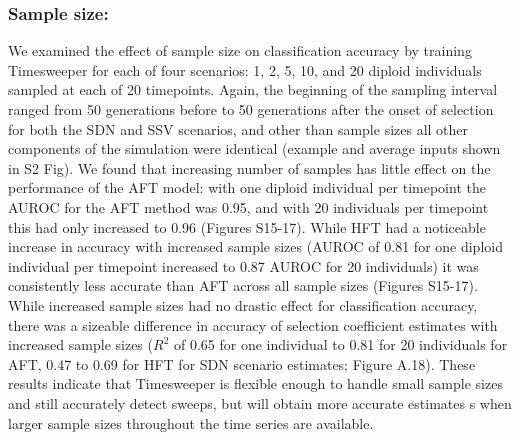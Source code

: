 \subsubsection{Sample size:} We examined the effect of sample size on classification accuracy by training Timesweeper for each of four scenarios: 1, 2, 5, 10, and 20 diploid individuals sampled at each of 20 timepoints. Again, the beginning of the sampling interval ranged from 50 generations before to 50 generations after the onset of selection for both the SDN and SSV scenarios, and other than sample sizes all other components of the simulation were identical (example and average inputs shown in S2 Fig). We found that increasing number of samples has little effect on the performance of the AFT model: with one diploid individual per timepoint the AUROC for the AFT method was 0.95, and with 20 individuals per timepoint this had only increased to 0.96 (Figures S15-17). While HFT had a noticeable increase in accuracy with increased sample sizes (AUROC of 0.81 for one diploid individual per timepoint increased to 0.87 AUROC for 20 individuals) it was consistently less accurate than AFT across all sample sizes (Figures S15-17).
While increased sample sizes had no drastic effect for classification accuracy, there was a sizeable difference in accuracy of selection coefficient estimates with increased sample sizes ($R^2$ of 0.65 for one individual to 0.81 for 20 individuals for AFT, 0.47 to 0.69 for HFT for SDN scenario estimates; Figure A.18). These results indicate that Timesweeper is flexible enough to handle small sample sizes and still accurately detect sweeps, but will obtain more accurate estimates s when larger sample sizes throughout the time series are available. \\

